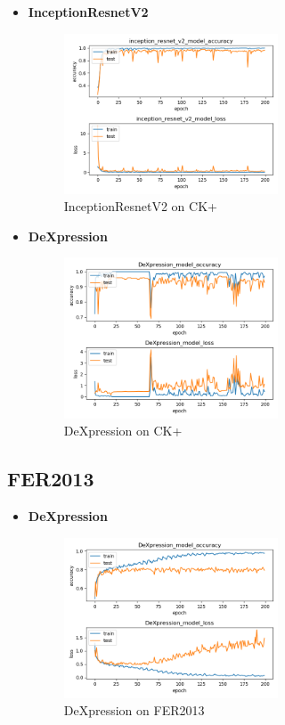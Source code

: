 \documentclass[11pt]{article}
\begin{document}
\begin{itemize}
		\item \textbf{InceptionResnetV2}
		\begin{figure}[ht]
			\centering
			\includegraphics[width=0.6\textwidth]{inceptionResnetV2_res}
			\caption{InceptionResnetV2 on CK+}
		\end{figure}
				
		\newpage
			
		\item \textbf{DeXpression}
		\begin{figure}[ht]
			\centering
			\includegraphics[width=0.6\textwidth]{DeXpression_CK+_res}
			\caption{DeXpression on CK+}
		\end{figure}
		
	\end{itemize}

	\subsection{FER2013}
	\begin{itemize}
		\item \textbf{DeXpression}
		\begin{figure}[ht]
			\centering
			\includegraphics[width=0.6\textwidth]{DeXpression_FER_res}
			\caption{DeXpression on FER2013}
		\end{figure}
	\end{itemize}
\end{document}
